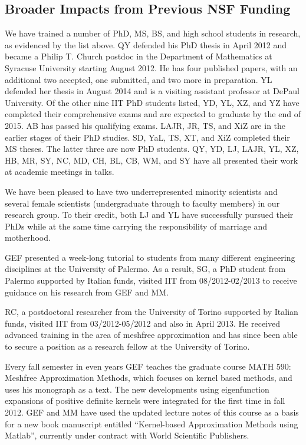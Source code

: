 \documentclass[11pt]{NSFamsart}
\newcommand{\Matlab}{{\sc Matlab}\xspace}
\begin{document}
\subsection{Broader Impacts from Previous NSF Funding}

We have trained a number of PhD, MS, BS, and high school students in research, as evidenced by the list above.  QY defended his PhD thesis in April 2012 and became a Philip T. Church postdoc in the Department of Mathematics at Syracuse University starting August 2012. He has four published papers, with an additional two accepted, one submitted, and two more in preparation.  YL defended her thesis in August 2014 and is a visiting assistant professor at DePaul University.  Of the other nine IIT PhD students listed, YD, YL, XZ, and YZ have completed their comprehensive exams and are expected to graduate by the end of 2015.  AB has passed his qualifying exams.  LAJR, JR, TS, and XiZ are in the earlier stages of their PhD studies. SD, YaL, TS, XT, and XiZ completed their MS theses. The latter three are now PhD students.  QY, YD, LJ, LAJR, YL, XZ, HB, MR, SY, NC, MD, CH, BL, CB, WM, and SY have all presented their work at academic meetings in talks.

We have been pleased to have two underrepresented minority scientists and several female scientists (undergraduate through to faculty members) in our research group.  To their credit, both LJ and YL have successfully pursued their PhDs while at the same time carrying the responsibility of marriage and motherhood.

GEF presented a week-long tutorial to students from many different engineering disciplines at the University of Palermo. As a result, SG, a PhD student from Palermo supported by Italian funds, visited IIT from 08/2012-02/2013 to receive guidance on his research from GEF and MM.

RC, a postdoctoral researcher from the University of Torino supported by Italian funds, visited IIT from 03/2012-05/2012 and also in April 2013. He received advanced training in the area of meshfree approximation and has since been able to secure a position as a research fellow at the University of Torino.

Every fall semester in even years GEF teaches the graduate course MATH 590: Meshfree Approximation Methods, which focuses on kernel based methods, and uses his monograph \citep{Fas07a} as a text. The new developments using eigenfunction expansions of positive definite kernels were integrated for the first time in fall 2012. GEF and MM have used the updated lecture notes of this course as a basis for a new book manuscript entitled ``Kernel-based Approximation Methods using \Matlab'', currently under contract with World Scientific Publishers.
\end{document}
